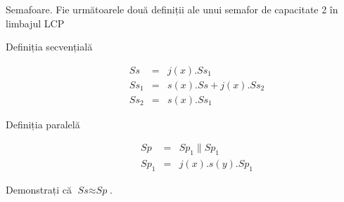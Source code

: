 \documentclass[addpoints,12pt,a4paper,answers]{exam}
\begin{document}
\begin{questions}
Semafoare.  Fie următoarele două definiții ale unui semafor de capacitate 2 în limbajul LCP

\begin{description}
\item[Definiția secvențială]
\[
\begin{array}{lcl}
\textit{Ss} & =  & j(x). \textit{Ss}_1\\
\textit{Ss}_1 & = & s(x).\textit{Ss} + j(x).\textit{Ss}_2 \\
\textit{Ss}_2 & = & s(x).\textit{Ss}_1
\end{array}
\]
\item[Definiția paralelă]
\[
\begin{array}{lcl}
\textit{Sp} & =  & \textit{Sp}_1 \parallel \textit{Sp}_1\\
\textit{Sp}_1 & = & j(x).s(y).\textit{Sp}_1
\end{array}
\]
\end{description}

Demonstrați că $\textit{Ss}  \approx \textit{Sp}$.

\end{questions}
\end{document}
